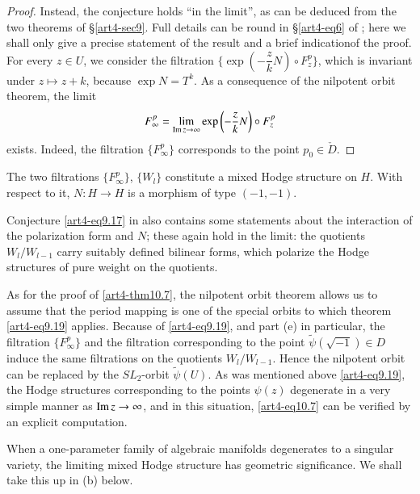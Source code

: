 \begin{proof}
Instead, the conjecture holds ``in the limit'', as can be deduced from the two theorems of \S \ref{art4-sec9}. Full details can be round in \S\ref{art4-eq6} of \cite{art4-key41}; here we shall only give a precise statement of the result and a brief indication\pageoriginale of the proof. For every $z \in U$, we consider the filtration $\{\exp \left( - \dfrac{z}{k} N\right) \circ F^p_z\}$, which is invariant under $z \longmapsto z +k$, because $\exp N = T^k$. As a consequence of the nilpotent orbit theorem, the limit
\begin{equation}
F^p_\infty = \lim\limits_{\operatorname{Im} z \to \infty} \exp \left(-\frac{z}{k} N \right) \circ F^p_z 
\label{art4-eq10.6}
\end{equation}
exists. Indeed, the filtration $\{F^p_\infty\}$ corresponds to the point $p_0 \in \check{D}$.
\end{proof}

\setcounter{theorem}{6}
\begin{theorem}\label{art4-thm10.7}
The two filtrations $\{F^p_\infty\}$, $\{W_l\}$ constitute a mixed Hodge structure on $H$. With respect to it, $N : H \to H$ is a morphism of type $(-1, -1)$.
\end{theorem}


Conjecture \eqref{art4-eq9.17} in \cite{art4-key21} also contains some statements about the interaction of the polarization form and $N$; these again hold in the limit: the quotients $W_l / W_{l-1}$ carry suitably defined bilinear forms, which polarize the Hodge structures of pure weight on the quotients.

As for the proof of \eqref{art4-thm10.7}, the nilpotent orbit theorem allows us to assume that the period mapping is one of the special orbits to which theorem \eqref{art4-eq9.19} applies. Because of \eqref{art4-eq9.19}, and part (e) in particular, the filtration $\{F^p_\infty\}$ and the filtration corresponding to the point $\tilde{\psi}(\sqrt{-1}) \in D$ induce the same filtrations on the quotients $W_l / W_{l-1}$. Hence the nilpotent orbit can be replaced by the $SL_2$-orbit $\tilde{\psi} (U)$. As was mentioned above \eqref{art4-eq9.19}, the Hodge structures corresponding to the points $\psi (z)$ degenerate in a very simple manner as $\operatorname{Im} z \to \infty$, and in this situation, \eqref{art4-eq10.7} can be verified by an explicit computation.

When a one-parameter family of algebraic manifolds degenerates to a singular variety, the limiting mixed Hodge structure has geometric significance. We shall take this up in (b) below.

